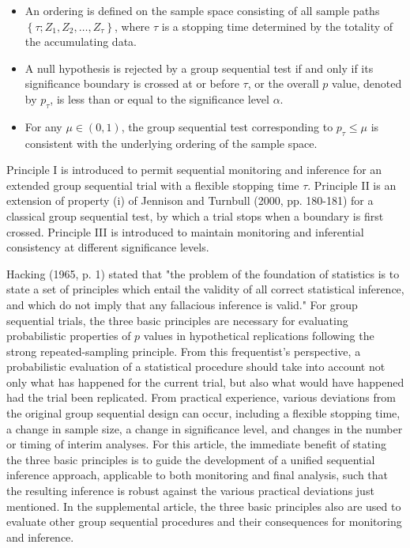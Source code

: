 \documentclass[10pt]{article}
\begin{document}
\begin{itemize}
  \item[I.] An ordering is defined on the sample space consisting of all sample paths $\left\{\tau ; Z_{1}, Z_{2}, \ldots, Z_{\tau}\right\}$, where $\tau$ is a stopping time determined by the totality of the accumulating data.
  \item[II.] A null hypothesis is rejected by a group sequential test if and only if its significance boundary is crossed at or before $\tau$, or the overall $p$ value, denoted by $p_{\tau}$, is less than or equal to the significance level $\alpha$.
  \item[III.] For any $\mu \in(0,1)$, the group sequential test corresponding to $p_{\tau} \leq \mu$ is consistent with the underlying ordering of the sample space.
\end{itemize}

Principle I is introduced to permit sequential monitoring and inference for an extended group sequential trial with a flexible stopping time $\tau$. Principle II is an extension of property (i) of Jennison and Turnbull (2000, pp. 180-181) for a classical group sequential test, by which a trial stops when a boundary is first crossed. Principle III is introduced to maintain monitoring and inferential consistency at different significance levels.

Hacking (1965, p. 1) stated that "the problem of the foundation of statistics is to state a set of principles which entail the validity of all correct statistical inference, and which do not imply that any fallacious inference is valid." For group sequential trials, the three basic principles are necessary for evaluating probabilistic properties of $p$ values in hypothetical replications following the strong repeated-sampling principle. From this frequentist's perspective, a probabilistic evaluation of a statistical procedure should take into account not only what has happened for the current trial, but also what would have happened had the trial been replicated. From practical experience, various deviations from the original group sequential design can occur, including a flexible stopping time, a change in sample size, a change in significance level, and changes in the number or timing of interim analyses. For this article, the immediate benefit of stating the three basic principles is to guide the development of a unified sequential inference approach, applicable to both monitoring and final analysis, such that the resulting inference is robust against the various practical deviations just mentioned. In the supplemental article, the three basic principles also are used to evaluate other group sequential procedures and their consequences for monitoring and inference.
\end{document}
